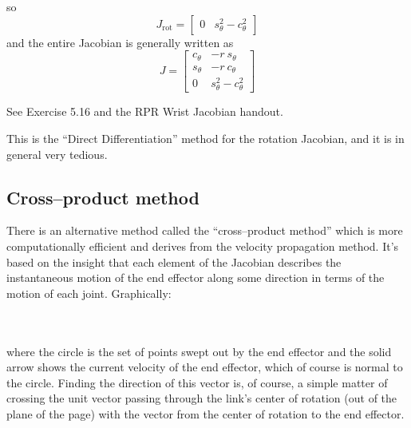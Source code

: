 \documentclass[]{article}
\begin{document}
so
\begin{displaymath}
J_{\text{rot}} = \left[ \begin{array}{cc} 0 & s_{\theta}^{2}-c_{\theta}^{2} \end{array} \right]
\end{displaymath}
and the entire Jacobian is generally written as 
\begin{displaymath}
J = \left[ \begin{array}{cc} c_{\theta} & -r\ s_{\theta} \\ s_{\theta} & -r\ c_{\theta} \\ 0 & s_{\theta}^{2}-c_{\theta}^{2} \end{array} \right]
\end{displaymath}

See Exercise 5.16 and the RPR Wrist Jacobian handout.

This is the ``Direct Differentiation'' method for the rotation Jacobian, and it is in general very tedious.

\subsection{Cross--product method}
There is an alternative method called the ``cross--product method'' which is more computationally efficient and derives from the velocity propagation method. It's based on the insight that each element of the Jacobian describes the instantaneous motion of the end effector along some direction in terms of the motion of each joint. Graphically:

\\
\\

where the circle is the set of points swept out by the end effector and the solid arrow shows the current velocity of the end effector, which of course is normal to the circle. Finding the direction of this vector is, of course, a simple matter of crossing the unit vector passing through the link's center of rotation (out of the plane of the page) with the vector from the center of rotation to the end effector.
\end{document}

